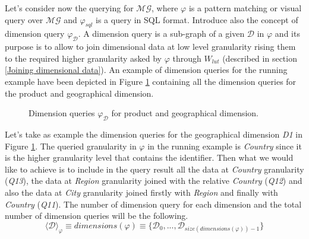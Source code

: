 \documentclass[12pt,a4paper]{report}
\newcommand\globalQuery{\varphi}
\newcommand\sqlQuery{\varphi_{sql}}
\newcommand\lut{W_{lut}}
\newcommand\dimension{\mathcal{D}}
\newcommand\dimensions{dimensions}
\newcommand\multidimensionalGraph{\mathcal{MG}}
\newcommand\set[1]{\langle #1 \rangle}
\newcommand\dimensionQuery{\globalQuery_{\dimension}}
\begin{document}
Let's consider now the querying for $\multidimensionalGraph$, where $\globalQuery$ is a pattern matching or visual query over $\multidimensionalGraph$ and $\sqlQuery$ is a query in SQL format.
%
Introduce also the concept of dimension query $\dimensionQuery$.
%
A dimension query is a sub-graph of a given $\dimension$ in $\globalQuery$ and its purpose is to allow to join dimensional data at low level granularity rising them to the required higher granularity asked by $\globalQuery$ through $\lut$ (described in section \ref{Joining dimensional data}).
%
An example of dimension queries for the running example have been depicted in Figure \ref{fig:dimension_queries} containing all the dimension queries for the product and  geographical dimension.
%
\begin{figure} [ht]
    \caption{Dimension queries $\dimensionQuery$ for product and  geographical dimension.}
    \label{fig:dimension_queries}
\end{figure}
%
Let's take as example the dimension queries for the geographical dimension \textit{D1} in Figure \ref{fig:dimension_queries}.
%
The queried granularity in $\globalQuery$ in the running example is \textit{Country} since it is the higher granularity level that contains the identifier.
%
Then what we would like to achieve is to include in the query result all the data at \textit{Country} granularity (\textit{Q13}), the data at \textit{Region} granularity joined with the relative \textit{Country} (\textit{Q12}) and also the data at \textit{City} granularity joined firstly with \textit{Region} and finally with \textit{Country} (\textit{Q11}).
%
The number of dimension query for each dimension and the total number of dimension queries will be the following.
%
\begin{equation}
    \set{\dimension}_{\globalQuery} \equiv \dimensions(\globalQuery) \equiv \{\dimension_{0},...,\dimension_{size(\dimensions(\globalQuery)) - 1}\}
\end{equation}
%
\end{document}
